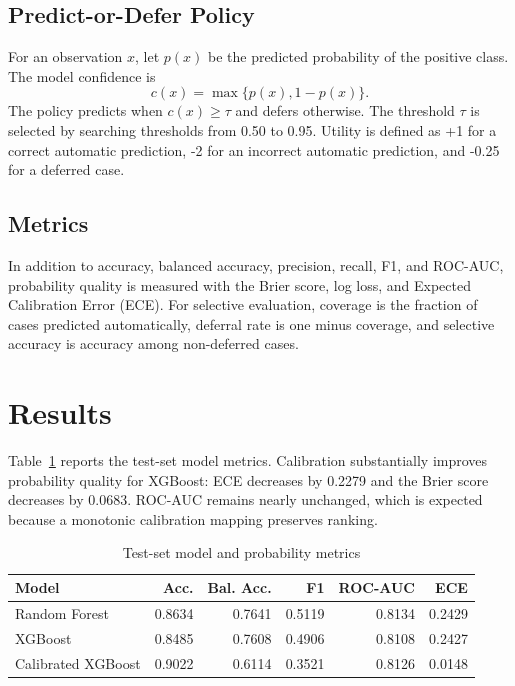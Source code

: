 \documentclass[conference]{IEEEtran}
\begin{document}
\subsection{Predict-or-Defer Policy}
For an observation $x$, let $p(x)$ be the predicted probability of the positive class. The model confidence is
\begin{equation}
 c(x)=\max\{p(x),1-p(x)\}.
\end{equation}
The policy predicts when $c(x)\geq\tau$ and defers otherwise. The threshold $\tau$ is selected by searching thresholds from 0.50 to 0.95. Utility is defined as +1 for a correct automatic prediction, -2 for an incorrect automatic prediction, and -0.25 for a deferred case.

\subsection{Metrics}
In addition to accuracy, balanced accuracy, precision, recall, F1, and ROC-AUC, probability quality is measured with the Brier score, log loss, and Expected Calibration Error (ECE). For selective evaluation, coverage is the fraction of cases predicted automatically, deferral rate is one minus coverage, and selective accuracy is accuracy among non-deferred cases.

\section{Results}
Table~\ref{tab:models} reports the test-set model metrics. Calibration substantially improves probability quality for XGBoost: ECE decreases by 0.2279 and the Brier score decreases by 0.0683. ROC-AUC remains nearly unchanged, which is expected because a monotonic calibration mapping preserves ranking.

\begin{table}[t]
\caption{Test-set model and probability metrics}
\label{tab:models}
\centering
\footnotesize
\begin{tabular}{lrrrrr}
\toprule
Model & Acc. & Bal. Acc. & F1 & ROC-AUC & ECE \\
\midrule
Random Forest & 0.8634 & 0.7641 & 0.5119 & 0.8134 & 0.2429 \\
XGBoost & 0.8485 & 0.7608 & 0.4906 & 0.8108 & 0.2427 \\
Calibrated XGBoost & 0.9022 & 0.6114 & 0.3521 & 0.8126 & 0.0148 \\
\bottomrule
\end{tabular}
\end{table}
\end{document}
